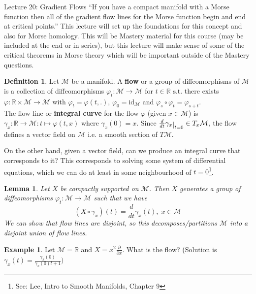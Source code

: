 \documentclass[10pt]{article}
\theoremstyle{plain}
\newtheorem{lemma}[thm]{Lemma}
\theoremstyle{definition}
\newtheorem{defn}[thm]{Definition} %
\newtheorem{exmp}[thm]{Example} %
\newcommand{\st}{\text{ s.t. }}
\newcommand{\id}{\text{id}}
\newcommand{\Real}{\mathbb{R}}
\newcommand{\man}{\mathcal{M}}
\newcommand{\xman}{x\in\man}
\newcommand{\tang}{T_x\man}
\newcommand{\deriv}{d}
\newcommand{\dt}{\deriv t}
\def\restrict#1{\raise-.5ex\hbox{\ensuremath|}_{#1}}
\newcommand{\parderiv}[1]{\frac{\partial}{\partial {#1}}}
\begin{document}
\begin{section}{Lecture 20: Gradient Flows}
``If you have a compact manifold with a Morse function then all of the gradient flow lines for the Morse function begin and end at critical points.'' This lecture will set up the foundations for this concept and also for Morse homology. This will be Mastery material for this course (may be included at the end or in series), but this lecture will make sense of some of the critical theorems in Morse theory which will be important outside of the Mastery questions. %
\begin{defn}
    Let $\man$ be a manifold. A \textbf{flow} or a group of diffeomorphisms of $\man$ is a collection of diffeomorphisms $\varphi_t : \man \to \man$ for $t\in \Real \st $there exists $\varphi:\Real \times \man \to \man $ with $\varphi_t = \varphi(t , . )$, $\varphi_0 = \id_\man$ and $\varphi_s \circ \varphi_t = \varphi_{s+t}$.\\
    The flow line or \textbf{integral curve} for the flow $\varphi$ (given $\xman$) is $\gamma_x : \Real \to \man : t \mapsto \varphi(t,x)$ where $\gamma_x(0) = x$. Since $\frac{\deriv}{\dt} \gamma_x \restrict{t=0} \in \tang$, the flow defines a vector field on $\man$ i.e. a smooth section of $T\man$.
\end{defn}
On the other hand, given a vector field, can we produce an integral curve that corresponds to it? This corresponds to solving some system of differential equations, which we can do at least in some neighbourhood of $t=0$\footnote{See: Lee, Intro to Smooth Manifolds, Chapter 9}. 

\begin{lemma}
    Let $X$ be compactly supported on $\man$. Then $X$ generates a group of diffeomorphisms $\varphi_t : \man \to \man$ such that we have $$(X\circ \gamma_x)(t) = \frac{\deriv}{\dt}\gamma_x(t),\; \xman$$
    We can show that flow lines are disjoint, so this decomposes/partitions $\man$ into a disjoint union of flow lines.
\end{lemma}

\begin{exmp}
    Let $\man = \Real$ and $X = x^2 \parderiv{x}$. What is the flow? (Solution is $\gamma_x(t) = \frac{\gamma_x(0)}{\gamma_x(0) t + 1})$
\end{exmp}


\end{section}
\end{document}
